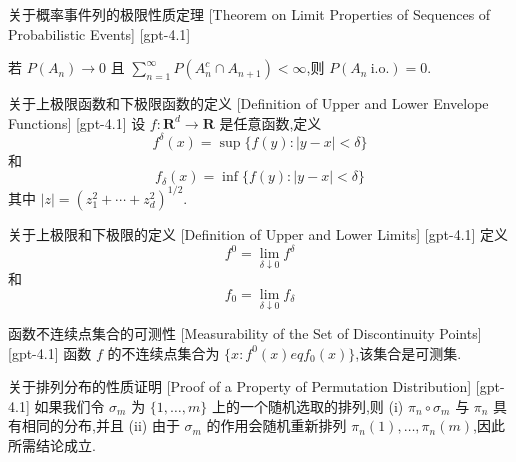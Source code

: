 \documentclass[UTF8]{ctexart}
\begin{document}
    \begin{thm}
        {关于概率事件列的极限性质定理}
        [Theorem on Limit Properties of Sequences of Probabilistic Events]
        [gpt-4.1]
        
若 $P(A_n) \to 0$ 且 $\sum_{n=1}^{\infty} P(A_n^c \cap A_{n+1}) < \infty$,则 $P(A_n \ \text{i.o.}) = 0$.

    \end{thm}
    
    
    
    \begin{dfn}
        {关于上极限函数和下极限函数的定义}
        [Definition of Upper and Lower Envelope Functions]
        [gpt-4.1]
        设 $f : \mathbf{R}^d \to \mathbf{R}$ 是任意函数,定义
\[
f^{\delta}(x) = \sup\{ f(y) : |y-x| < \delta \}
\]
和
\[
f_{\delta}(x) = \inf\{ f(y) : |y-x| < \delta \}
\]
其中 $|z| = (z_1^2 + \cdots + z_d^2)^{1/2}$.
    \end{dfn}
    
    
    
    \begin{dfn}
        {关于上极限和下极限的定义}
        [Definition of Upper and Lower Limits]
        [gpt-4.1]
        定义
\[
f^0 = \lim_{\delta \downarrow 0} f^{\delta}
\]
和
\[
f_0 = \lim_{\delta \downarrow 0} f_{\delta}
\]

    \end{dfn}
    
    
    
    \begin{thm}
        {函数不连续点集合的可测性}
        [Measurability of the Set of Discontinuity Points]
        [gpt-4.1]
        函数 $f$ 的不连续点集合为 $\{ x : f^0(x) 
eq f_0(x) \}$,该集合是可测集.
    \end{thm}
    
    
    
    \begin{prf}
        {关于排列分布的性质证明}
        [Proof of a Property of Permutation Distribution]
        [gpt-4.1]
        如果我们令 $\sigma_{m}$ 为 $\{1, \ldots, m\}$ 上的一个随机选取的排列,则 (i) $\pi_{n} \circ \sigma_{m}$ 与 $\pi_{n}$ 具有相同的分布,并且 (ii) 由于 $\sigma_{m}$ 的作用会随机重新排列 $\pi_{n}(1), \ldots, \pi_{n}(m)$,因此所需结论成立.
    \end{prf}
    
\end{document}

